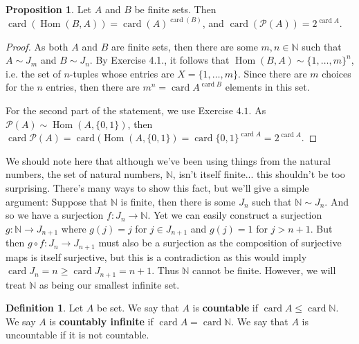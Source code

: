 \documentclass[9pt,reqno]{amsart}
\theoremstyle{definition}
\newtheorem{defi}{Definition}[section]
\newtheorem{prop}{Proposition}[section]
\newcommand{\nn}{\mathbb N}
\DeclareMathOperator{\Hom}{Hom}
\DeclareMathOperator{\card}{card}
\begin{document}
\begin{prop}
Let $A$ and $B$ be finite sets. Then $ \card (\Hom (B, A)) = \card (A)^{\card (B) }$, and $\card (\mathcal P (A)) = 2^{\card A }$. 
\end{prop}
\begin{proof}
	As both $A$ and $B$ are finite sets, then there are some $m, n \in \nn$ such that $A \sim J_m$ and $B \sim J_n$. By Exercise 4.1., it follows that $\Hom (B,A) \sim \{1, \ldots, m\}^n$, i.e. the set of $n$-tuples whose entries are $X = \{1, \ldots, m \}$. Since there are $m$ choices for the $n$ entries, then there are $m^n = \card A ^{\card B}$ elements in this set. 
	
	For the second part of the statement, we use Exercise $4.1.$ As $\mathcal P(A) \sim \Hom (A, \{0,1 \})$, then \\ $\card \mathcal P (A) = \card (\Hom (A, \{0,1 \}) = \card \{0,1 \}^{\card A } = 2^{\card A }$.
\end{proof}
We should note here that although we've been using things from the natural numbers, the set of natural numbers, $\nn$, isn't itself finite... this shouldn't be too surprising. There's many ways to show this fact, but we'll give a simple argument: Suppose that $\nn$ is finite, then there is some $J_n$ such that $\nn \sim J_n$. And so we have a surjection $f \colon J_n \to \nn$. Yet we can easily construct a surjection $g \colon \nn \to J_{n+1}$ where $g(j) = j$ for $j \in J_{n+1}$ and $g(j) = 1$ for $j >n+1$. But then $g \circ f \colon J_n \to J_{n+1}$ must also be a surjection as the composition of surjective maps is itself surjective, but this is a contradiction as this would imply $\card J_n = n \geq \card J_{n+1} = n +1$. Thus $\nn$ cannot be finite. However, we will treat $\nn$ as being our smallest infinite set. 
\begin{defi}
Let $A$ be set. We say that $A$ is \textbf{countable} if $\card A \leq \card \nn$. We say $A$ is \textbf{countably infinite} if $\card A = \card \nn$. We say that $A$ is uncountable if it is not countable. 	
\end{defi}
\end{document}
